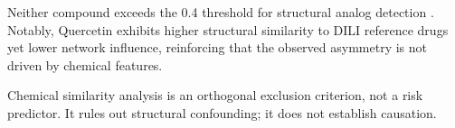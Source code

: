 Neither compound exceeds the 0.4 threshold for structural analog detection \citep{Maggiora2014}.
Notably, Quercetin exhibits higher structural similarity to DILI reference drugs yet lower network influence, reinforcing that the observed asymmetry is not driven by chemical features.

Chemical similarity analysis is an orthogonal exclusion criterion, not a risk predictor.
It rules out structural confounding; it does not establish causation.

